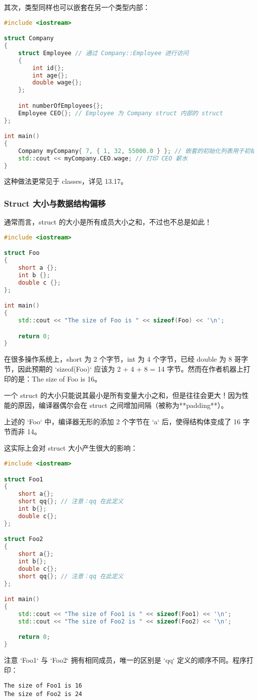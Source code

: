 \documentclass[../../LearnCpp.tex]{subfiles}
\begin{document}
其次，类型同样也可以嵌套在另一个类型内部：

\begin{lstlisting}[language=C++]
#include <iostream>

struct Company
{
    struct Employee // 通过 Company::Employee 进行访问
    {
        int id{};
        int age{};
        double wage{};
    };

    int numberOfEmployees{};
    Employee CEO{}; // Employee 为 Company struct 内部的 struct
};

int main()
{
    Company myCompany{ 7, { 1, 32, 55000.0 } }; // 嵌套的初始化列表用于初始化 Employee
    std::cout << myCompany.CEO.wage; // 打印 CEO 薪水
}
\end{lstlisting}

这种做法更常见于 classes，详见 13.17。

\subsubsection*{Struct 大小与数据结构偏移}

通常而言，struct 的大小是所有成员大小之和，不过也不总是如此！

\begin{lstlisting}[language=C++]
#include <iostream>

struct Foo
{
    short a {};
    int b {};
    double c {};
};

int main()
{
    std::cout << "The size of Foo is " << sizeof(Foo) << '\n';

    return 0;
}
\end{lstlisting}

在很多操作系统上，short 为 2 个字节，int 为 4 个字节，已经 double 为 8 哥字节，因此预期的 `sizeof(Foo)` 应该为 2 + 4 + 8 = 14 字节。然而在作者机器上打印的是：The size of Foo is 16。

一个 struct 的大小只能说其最小是所有变量大小之和，但是往往会更大！因为性能的原因，编译器偶尔会在 struct 之间增加间隔（被称为**padding**）。

上述的 `Foo` 中，编译器无形的添加 2 个字节在 `a` 后，使得结构体变成了 16 字节而非 14。

这实际上会对 struct 大小产生很大的影响：

\begin{lstlisting}[language=C++]
#include <iostream>

struct Foo1
{
    short a{};
    short qq{}; // 注意：qq 在此定义
    int b{};
    double c{};
};

struct Foo2
{
    short a{};
    int b{};
    double c{};
    short qq{}; // 注意：qq 在此定义
};

int main()
{
    std::cout << "The size of Foo1 is " << sizeof(Foo1) << '\n';
    std::cout << "The size of Foo2 is " << sizeof(Foo2) << '\n';

    return 0;
}
\end{lstlisting}

注意 `Foo1` 与 `Foo2` 拥有相同成员，唯一的区别是 `qq` 定义的顺序不同。程序打印：

\begin{lstlisting}
The size of Foo1 is 16
The size of Foo2 is 24
\end{lstlisting}
\end{document}
